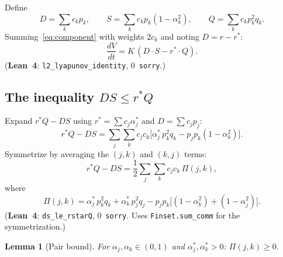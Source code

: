 \documentclass[11pt,a4paper]{article}
\newtheorem{lemma}[theorem]{Lemma}
\theoremstyle{definition}
\begin{document}
Define
\[
D = \sum_k c_k p_k, \qquad S = \sum_k c_k p_k(1-\alpha_k^2), \qquad Q = \sum_k c_k p_k^2 q_k.
\]
Summing~\eqref{eq:component} with weights $2c_k$ and noting $D = r - r^*$:
\begin{equation}\label{eq:identity}
\frac{dV}{dt} = K\,(D \cdot S - r^* \cdot Q).
\end{equation}
(\textbf{Lean~4}: \texttt{l2\_lyapunov\_identity}, 0~\texttt{sorry}.)

\subsection{The inequality $DS \leq r^*Q$}

Expand $r^*Q - DS$ using $r^* = \sum c_j\alpha_j^*$ and $D = \sum c_j p_j$:
\[
r^*Q - DS = \sum_j\sum_k c_j c_k\bigl[\alpha_j^*\,p_k^2 q_k - p_j p_k(1-\alpha_k^2)\bigr].
\]
Symmetrize by averaging the $(j,k)$ and $(k,j)$ terms:
\begin{equation}\label{eq:symmetrized}
r^*Q - DS = \frac{1}{2}\sum_j\sum_k c_jc_k\,\Pi(j,k),
\end{equation}
where
\[
\Pi(j,k) = \alpha_j^*\,p_k^2 q_k + \alpha_k^*\,p_j^2 q_j - p_jp_k\bigl[(1-\alpha_k^2)+(1-\alpha_j^2)\bigr].
\]
(\textbf{Lean~4}: \texttt{ds\_le\_rstarQ}, 0~\texttt{sorry}. Uses \texttt{Finset.sum\_comm} for the symmetrization.)

\begin{lemma}[Pair bound]\label{lem:pair}
For $\alpha_j, \alpha_k \in (0,1)$ and $\alpha_j^*, \alpha_k^* > 0$: $\Pi(j,k) \geq 0$.
\end{lemma}
\end{document}
